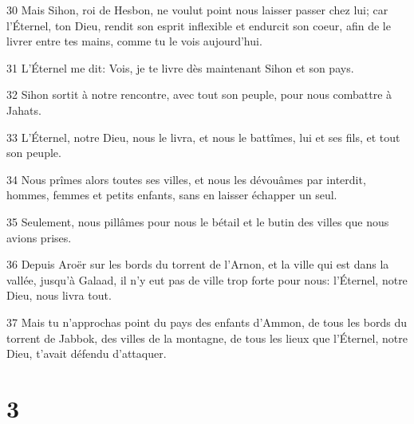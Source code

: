 \par 30 Mais Sihon, roi de Hesbon, ne voulut point nous laisser passer chez lui; car l'Éternel, ton Dieu, rendit son esprit inflexible et endurcit son coeur, afin de le livrer entre tes mains, comme tu le vois aujourd'hui.
\par 31 L'Éternel me dit: Vois, je te livre dès maintenant Sihon et son pays.
\par 32 Sihon sortit à notre rencontre, avec tout son peuple, pour nous combattre à Jahats.
\par 33 L'Éternel, notre Dieu, nous le livra, et nous le battîmes, lui et ses fils, et tout son peuple.
\par 34 Nous prîmes alors toutes ses villes, et nous les dévouâmes par interdit, hommes, femmes et petits enfants, sans en laisser échapper un seul.
\par 35 Seulement, nous pillâmes pour nous le bétail et le butin des villes que nous avions prises.
\par 36 Depuis Aroër sur les bords du torrent de l'Arnon, et la ville qui est dans la vallée, jusqu'à Galaad, il n'y eut pas de ville trop forte pour nous: l'Éternel, notre Dieu, nous livra tout.
\par 37 Mais tu n'approchas point du pays des enfants d'Ammon, de tous les bords du torrent de Jabbok, des villes de la montagne, de tous les lieux que l'Éternel, notre Dieu, t'avait défendu d'attaquer.

\chapter{3}

